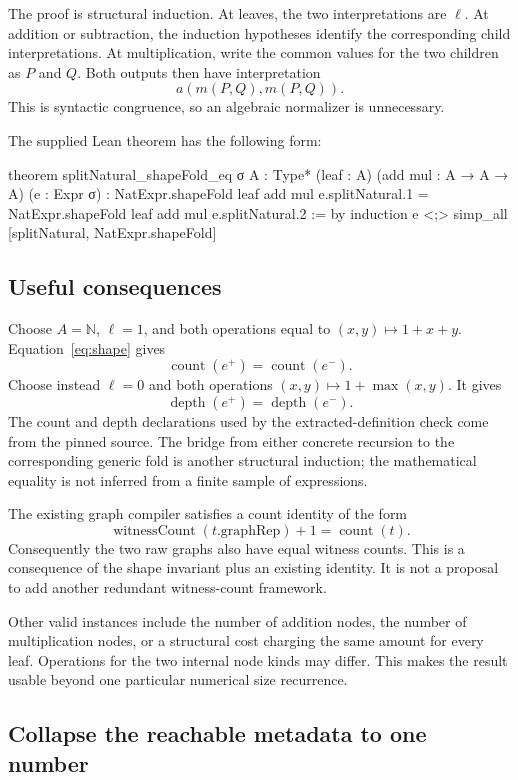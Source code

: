 \documentclass[11pt,letterpaper]{article}
\newcommand{\N}{\mathbb{N}}
\begin{document}
The proof is structural induction. At leaves, the two interpretations are $\ell$. At addition or subtraction, the induction hypotheses identify the corresponding child interpretations. At multiplication, write the common values for the two children as $P$ and $Q$. Both outputs then have interpretation
\[
 a(m(P,Q),m(P,Q)).
\]
This is syntactic congruence, so an algebraic normalizer is unnecessary.

The supplied Lean theorem has the following form:
\begin{Lean}
theorem splitNatural_shapeFold_eq {σ A : Type*} (leaf : A)
    (add mul : A → A → A) (e : Expr σ) :
    NatExpr.shapeFold leaf add mul e.splitNatural.1 =
      NatExpr.shapeFold leaf add mul e.splitNatural.2 := by
  induction e <;> simp_all [splitNatural, NatExpr.shapeFold]
\end{Lean}

\subsection{Useful consequences}

Choose $A=\N$, $\ell=1$, and both operations equal to $(x,y)\mapsto 1+x+y$. Equation~\eqref{eq:shape} gives
\[
 \operatorname{count}(e^+)=\operatorname{count}(e^-).
\]
Choose instead $\ell=0$ and both operations $(x,y)\mapsto 1+\max(x,y)$. It gives
\[
 \operatorname{depth}(e^+)=\operatorname{depth}(e^-).
\]
The count and depth declarations used by the extracted-definition check come from the pinned source. The bridge from either concrete recursion to the corresponding generic fold is another structural induction; the mathematical equality is not inferred from a finite sample of expressions.

The existing graph compiler satisfies a count identity of the form
\[
 \operatorname{witnessCount}(t.\mathrm{graphRep})+1
   =\operatorname{count}(t).
\]
Consequently the two raw graphs also have equal witness counts. This is a consequence of the shape invariant plus an existing identity. It is not a proposal to add another redundant witness-count framework.

Other valid instances include the number of addition nodes, the number of multiplication nodes, or a structural cost charging the same amount for every leaf. Operations for the two internal node kinds may differ. This makes the result usable beyond one particular numerical size recurrence.

\subsection{Collapse the reachable metadata to one number}
\end{document}
